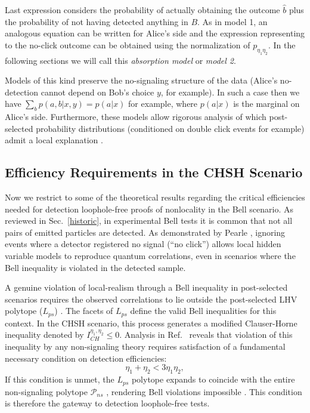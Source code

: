 \documentclass[aps,pra,reprint, superscriptaddress,showkeys]{revtex4-2}
\theoremstyle{plain}
\begin{document}
Last expression considers the probability of actually obtaining the outcome $\hat b$ plus the probability of not having detected anything in $B$.  As in model 1, an analogous equation can be written for Alice's side and the expression representing to the no-click  outcome can be obtained using the normalization of $p_{\eta_1 \eta_2}$. In the following sections we will call this \textit{absorption model} or \textit{model 2}.



Models of this kind preserve the no-signaling structure of the data (Alice’s no-detection cannot depend on Bob’s choice $y$, for example). In such a case then we have $\sum_b p(a,b|x,y) = p(a|x)$ for example, where $ p(a|x)$ is the marginal on Alice's side. Furthermore, these models allow rigorous analysis of which post-selected probability distributions (conditioned on double click events for example) admit a local explanation \cite{Wilms2008}.




\subsection{Efficiency Requirements in the CHSH Scenario}


Now we restrict to some of the theoretical results regarding the critical efficiencies needed for detection loophole-free proofs of nonlocality in the Bell scenario. As reviewed  in Sec.~\ref{historic}, in experimental Bell tests it is common that not all pairs of emitted particles are detected. As demonstrated by Pearle \cite{Pearle}, ignoring events where a detector registered no signal (``no click'') allows local hidden variable models to reproduce quantum correlations, even in scenarios where the Bell inequality is violated in the detected sample. 

A genuine violation of local-realism through a Bell inequality in post-selected scenarios requires the observed correlations to lie outside the post-selected LHV polytope ($L_{ps}$) \cite{Branciard2011}. The facets of $L_{ps}$ define the valid Bell inequalities for this context. In the CHSH scenario, this process generates a modified Clauser-Horne \cite{Clauser.Horne} inequality denoted by $I_{CH}^{\eta_1,\eta_2} \leq 0$. Analysis in Ref.~\cite{Branciard2011} reveals that violation of this inequality by any non-signaling theory requires satisfaction of a fundamental necessary condition on detection efficiencies:
\begin{equation}
\eta_1 + \eta_2 < 3\eta_1\eta_2,
\end{equation}
If this condition is unmet, the $L_{ps}$ polytope expands to coincide with the entire non-signaling polytope $\mathcal{P}_{ns}$ \cite{BrunnerREVIEW}, rendering Bell violations impossible \cite{Branciard2011}. This condition is therefore the gateway to detection loophole-free tests.
\end{document}
